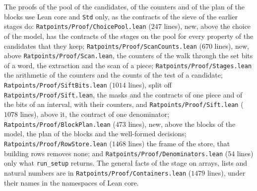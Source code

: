 The proofs of the pool of the candidates, of the counters and of the plan of the blocks use Lean
core and \verb|Std| only, as the contracts of the sieve of the earlier stages do:
\verb|Ratpoints/Proof/ChoicePool.lean| ($247$ lines), new, above the choice of the model, has the
contracts of the stages on the pool for every property of the candidates that they keep;
\verb|Ratpoints/Proof/ScanCounts.lean| ($670$ lines), new, above \verb|Ratpoints/Proof/Scan.lean|,
the counters of the walk through the set bits of a word, the extraction and the scan of a piece;
\verb|Ratpoints/Proof/Stages.lean| the arithmetic of the counters and the counts of the test of a
candidate; \verb|Ratpoints/Proof/SiftBits.lean| ($1014$ lines), split off
\verb|Ratpoints/Proof/Sift.lean|, the masks and the contracts of one piece and of the bits of an
interval, with their counters, and \verb|Ratpoints/Proof/Sift.lean| ($1078$ lines), above it, the
contract of one denominator; \verb|Ratpoints/Proof/BlockPlan.lean| ($473$ lines), new, above the
blocks of the model, the plan of the blocks and the well-formed decisions;
\verb|Ratpoints/Proof/RowStore.lean| ($1468$ lines) the frame of the store, that building rows
removes none; and \verb|Ratpoints/Proof/Denominators.lean| ($54$ lines) only what \verb|run_setup|
returns. The general facts of the stage on arrays, lists and natural numbers are in
\verb|Ratpoints/Proof/Containers.lean| ($1479$ lines), under their names in the namespaces of Lean
core.

